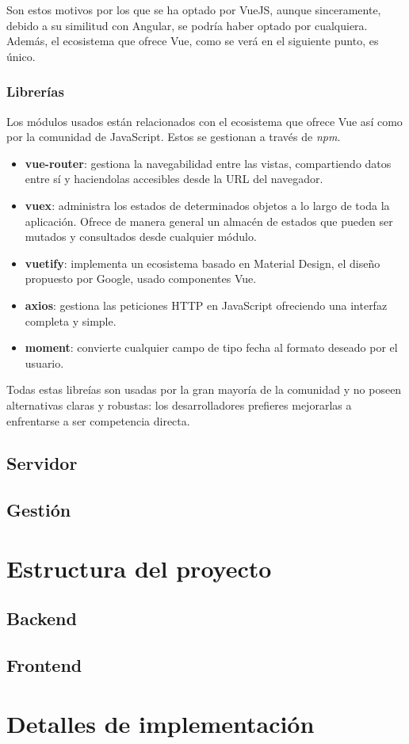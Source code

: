 Son estos motivos por los que se ha optado por VueJS, aunque sinceramente, debido a su similitud con Angular, se podría haber optado por cualquiera. Además, el ecosistema que ofrece Vue, como se verá en el siguiente punto, es único.

\subsubsection{Librerías}

Los módulos usados están relacionados con el ecosistema que ofrece Vue así como por la comunidad de JavaScript. Estos se gestionan a través de \textit{npm}.

\begin{itemize}
    \item \textbf{vue-router}: gestiona la navegabilidad entre las vistas, compartiendo datos entre sí y haciendolas accesibles desde la URL del navegador.
    \item \textbf{vuex}: administra los estados de determinados objetos a lo largo de toda la aplicación. Ofrece de manera general un almacén de estados que pueden ser mutados y consultados desde cualquier módulo.
    \item \textbf{vuetify}: implementa un ecosistema basado en Material Design, el diseño propuesto por Google, usado componentes Vue.
    \item \textbf{axios}: gestiona las peticiones HTTP en JavaScript ofreciendo una interfaz completa y simple.
    \item \textbf{moment}: convierte cualquier campo de tipo fecha al formato deseado por el usuario.
\end{itemize}

Todas estas libreías son usadas por la gran mayoría de la comunidad y no poseen alternativas claras y robustas: los desarrolladores prefieres mejorarlas a enfrentarse a ser competencia directa.

\subsection{Servidor}

\subsection{Gestión}

\section{Estructura del proyecto}\label{sec:estructra_proyecto}

\subsection{Backend}

\subsection{Frontend}

\section{Detalles de implementación}\label{sec:detalles_implementacion}